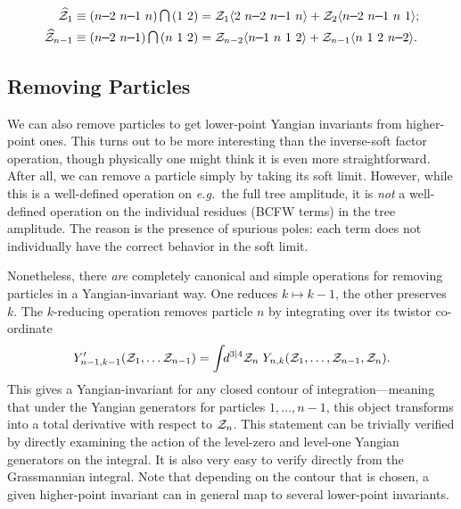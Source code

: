 \documentclass[11pt, reqno]{article}
\newcommand{\be}{\begin{eqnarray}}
\newcommand{\ee}{\end{eqnarray}}
\newcommand{\smallminus}{{\rm\rule[2.4pt]{6pt}{0.65pt}}}
\renewcommand{\cap}{\mathrm{\raisebox{0.75pt}{{$\,\bigcap\,$}}}}
\newcommand{\ab}[1]{\langle #1\rangle}
\begin{document}
\begin{equation}
\begin{split}\widehat{{\cal Z}}_1 &\equiv (n\smallminus2 \,\, n\smallminus1 \,\,n)\cap(1\,\,2) = \mathcal{Z}_1\ab{2\,\,n\smallminus2\,\,n\smallminus1\,\,n}+\mathcal{Z}_2\ab{n\smallminus2\,\,n\smallminus1\,\,n\,\,1}; \\
\widehat{{\cal Z}}_{n-1} &\equiv (n\smallminus2 \,\, n\smallminus1)\cap (n\,\,1\,\,2) = \mathcal{Z}_{n-2}\ab{n\smallminus1\,\,n\,\,1\,\,2}+\mathcal{Z}_{n-1}\ab{n\,\,1\,\,2\,\,n\smallminus2}.\end{split} \end{equation}

\subsection{Removing Particles}

We can also remove particles to get lower-point Yangian invariants from higher-point ones. This turns out to be more interesting than the inverse-soft factor operation, though physically one might think it is even more straightforward. After all, we can remove a particle simply by taking its soft limit. However, while this is a well-defined operation on {\it e.g.}~the full tree amplitude, it is {\it not} a well-defined operation on the individual residues (BCFW terms) in the tree amplitude. The reason is the presence of spurious poles: each term does not individually have the correct behavior in the soft limit.

Nonetheless, there {\it are} completely canonical and simple operations for removing particles in a Yangian-invariant way. One reduces
$k \mapsto k-1$, the other preserves $k$. The $k$-reducing
operation removes particle $n$ by integrating over its
twistor co-ordinate \be Y^\prime_{n-1,k-1}({\cal Z}_1, \ldots {\cal
Z}_{n-1})=\int\!\!d^{3|4} {\cal Z}_{n}\;Y_{n,k}({\cal Z}_1, \ldots, {\cal
Z}_{n-1}, {\cal Z}_{n}).  \ee This gives a Yangian-invariant for any
closed contour of integration---meaning that under the Yangian
generators for particles $1,\ldots,n-1$, this object transforms into
a total derivative with respect to ${\cal Z}_{n}$. This statement can be trivially verified by directly examining the action of the level-zero and level-one Yangian generators on the integral. It is also very easy to verify directly from the Grassmannian integral. Note that depending on the contour that is chosen, a given higher-point invariant can in general map to several lower-point invariants.
\end{document}
